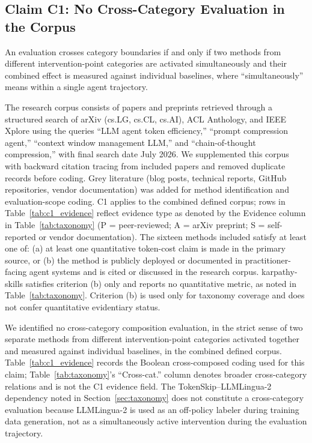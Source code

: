\documentclass{article}
\begin{document}
\subsection{Claim C1: No Cross-Category Evaluation in the Corpus}

An evaluation crosses category boundaries if and only if two methods from different intervention-point categories are activated simultaneously and their combined effect is measured against individual baselines, where ``simultaneously'' means within a single agent trajectory.

The research corpus consists of papers and preprints retrieved through a structured search of arXiv (cs.LG, cs.CL, cs.AI), ACL Anthology, and IEEE Xplore using the queries ``LLM agent token efficiency,'' ``prompt compression agent,'' ``context window management LLM,'' and ``chain-of-thought compression,'' with final search date July 2026. We supplemented this corpus with backward citation tracing from included papers and removed duplicate records before coding. Grey literature (blog posts, technical reports, GitHub repositories, vendor documentation) was added for method identification and evaluation-scope coding. C1 applies to the combined defined corpus; rows in Table~\ref{tab:c1_evidence} reflect evidence type as denoted by the Evidence column in Table~\ref{tab:taxonomy} (P = peer-reviewed; A = arXiv preprint; S = self-reported or vendor documentation). The sixteen methods included satisfy at least one of: (a) at least one quantitative token-cost claim is made in the primary source, or (b) the method is publicly deployed or documented in practitioner-facing agent systems and is cited or discussed in the research corpus. karpathy-skills satisfies criterion (b) only and reports no quantitative metric, as noted in Table~\ref{tab:taxonomy}. Criterion (b) is used only for taxonomy coverage and does not confer quantitative evidentiary status.

We identified no cross-category composition evaluation, in the strict sense of two separate methods from different intervention-point categories activated together and measured against individual baselines, in the combined defined corpus. Table~\ref{tab:c1_evidence} records the Boolean cross-composed coding used for this claim; Table~\ref{tab:taxonomy}'s ``Cross-cat.'' column denotes broader cross-category relations and is not the C1 evidence field. The TokenSkip--LLMLingua-2 dependency noted in Section~\ref{sec:taxonomy} does not constitute a cross-category evaluation because LLMLingua-2 is used as an off-policy labeler during training data generation, not as a simultaneously active intervention during the evaluation trajectory.
\end{document}
